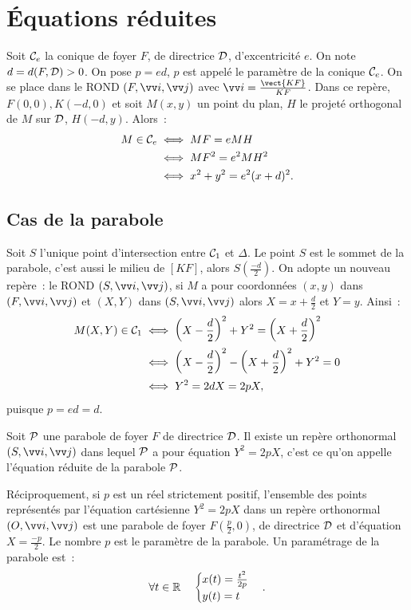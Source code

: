 \section{Équations réduites}
\label{sec:eqred}
Soit $\con{e}$ la conique de foyer $F$, de directrice $\Dr$, d'excentricité $e$. On note $d=d(F,\Dr)>0$. On pose $p=ed$, $p$ est appelé le paramètre de la conique $\con{e}$. On se place dans le ROND $(F,\vi,\vj)$ avec $\vi=\frac{\vect{KF}}{KF}$. Dans ce repère, $F(0,0), K(-d,0)$ et soit $M(x,y)$ un point du plan, $H$ le projeté orthogonal de $M$ sur $\Dr$, $H(-d,y)$. Alors~:
\begin{align}
  M \in \con{e} &\iff MF = e MH \\
  &\iff MF^2 = e^2 MH^2\\
  &\iff x^2+y^2=e^2(x+d)^2.
\end{align}

\subsection{Cas de la parabole}
Soit $S$ l'unique point d'intersection entre $\con{1}$ et $\Delta$. Le point $S$ est le sommet de la parabole, c'est aussi le milieu de $[KF]$, alors $S\left(\frac{-d}{2}\right)$. On adopte un nouveau repère~: le ROND $(S,\vi,\vj)$, si $M$ a pour coordonnées $(x,y)$ dans $(F,\vi,\vj)$ et $(X,Y)$ dans $(S,\vi,\vj)$ alors $X=x+\frac{d}{2}$ et $Y=y$. Ainsi~:
\begin{align}
  M(X,Y) \in \con{1} &\iff \left(X-\frac{d}{2}\right)^2+Y^2=\left(X+\frac{d}{2}\right)^2\\
  &\iff \left(X-\frac{d}{2}\right)^2 - \left(X+\frac{d}{2}\right)^2+Y^2=0\\
  &\iff Y^2=2dX=2pX,
\end{align}
puisque $p=ed=d$.
\begin{theo}
Soit $\P$ une parabole de foyer $F$ de directrice $\Dr$. Il existe un repère orthonormal $(S,\vi,\vj)$ dans lequel $\P$ a pour équation $Y^2=2pX$, c'est ce qu'on appelle l'équation réduite de la parabole $\P$.

Réciproquement, si $p$ est un réel strictement positif, l'ensemble des points représentés par l'équation cartésienne $Y^2=2pX$ dans un repère orthonormal $\rond$ est une parabole de foyer $F\left(\frac{p}{2},0\right)$, de directrice $\Dr$ et d'équation $X=\frac{-p}{2}$. Le nombre $p$ est le paramètre de la parabole. Un paramétrage de la parabole est~:
  \begin{equation}
    \forall t \in \R \quad
    \begin{cases}
      x(t)=\frac{t^2}{2p} \\
      y(t)=t
    \end{cases}.
  \end{equation}
\end{theo}

